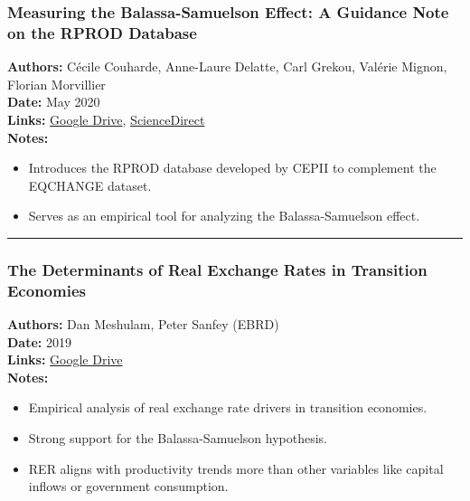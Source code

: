 \documentclass[
  11pt,
]{article}
\providecommand{\tightlist}{%
  \setlength{\itemsep}{0pt}\setlength{\parskip}{0pt}}
\begin{document}
\subsubsection{Measuring the Balassa-Samuelson Effect: A Guidance Note
on the RPROD
Database}\label{measuring-the-balassa-samuelson-effect-a-guidance-note-on-the-rprod-database}

\textbf{Authors:} Cécile Couharde, Anne-Laure Delatte, Carl Grekou,
Valérie Mignon, Florian Morvillier\\
\textbf{Date:} May 2020\\
\textbf{Links:}
\href{https://drive.google.com/file/d/16L1DDmRDnJ33SYlDcjePIBteyV5TkbHU/view?usp=sharing}{Google
Drive},
\href{https://www.sciencedirect.com/science/article/pii/S2110701720300417}{ScienceDirect}\\
\textbf{Notes:}

\begin{itemize}
\tightlist
\item
  Introduces the RPROD database developed by CEPII to complement the
  EQCHANGE dataset.
\item
  Serves as an empirical tool for analyzing the Balassa-Samuelson
  effect.
\end{itemize}

\begin{center}\rule{0.5\linewidth}{0.5pt}\end{center}

\subsubsection{The Determinants of Real Exchange Rates in Transition
Economies}\label{the-determinants-of-real-exchange-rates-in-transition-economies}

\textbf{Authors:} Dan Meshulam, Peter Sanfey (EBRD)\\
\textbf{Date:} 2019\\
\textbf{Links:}
\href{https://drive.google.com/file/d/1MldCJB2yPD3AEI93kt9qSX11rjcTdySo/view?usp=sharing}{Google
Drive}\\
\textbf{Notes:}

\begin{itemize}
\tightlist
\item
  Empirical analysis of real exchange rate drivers in transition
  economies.
\item
  Strong support for the Balassa-Samuelson hypothesis.
\item
  RER aligns with productivity trends more than other variables like
  capital inflows or government consumption.
\end{itemize}
\end{document}
